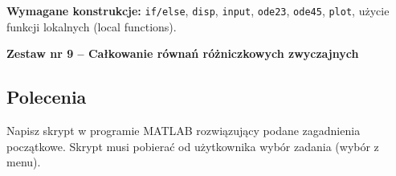\documentclass[a4paper,11pt]{article}
\begin{document}
\vspace{0.3cm}
\begin{ramka}
\textbf{Wymagane konstrukcje:}
\texttt{if/else}, \texttt{disp}, \texttt{input}, \texttt{ode23}, \texttt{ode45}, \texttt{plot}, użycie funkcji lokalnych (local functions).
\end{ramka}

\clearpage
\begin{center}
  {\large\bfseries Zestaw nr 9 \quad -- \quad Całkowanie równań różniczkowych zwyczajnych}
\end{center}
\hrulefill
\vspace{0.4cm}

\subsection*{Polecenia}

Napisz skrypt w programie MATLAB rozwiązujący podane zagadnienia początkowe. Skrypt musi pobierać od użytkownika wybór zadania (wybór z menu).
\end{document}
